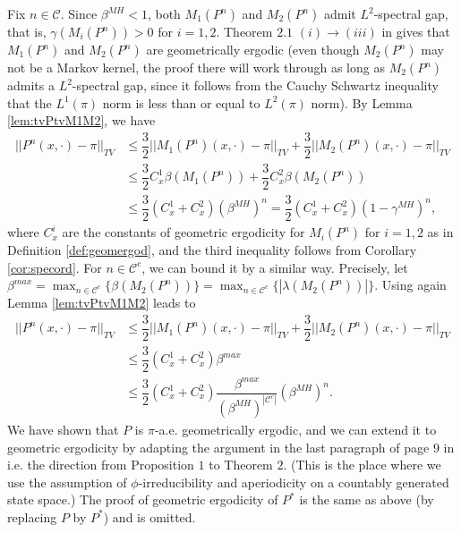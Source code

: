 \documentclass[12pt,a4]{amsart}
\numberwithin{equation}{section}
\theoremstyle{plain}
\theoremstyle{definition}
\theoremstyle{remark}
\let\oldendproof\endproof
\renewenvironment{proof}[1][\proofname]{%
  \oldproof[\noindent\textbf{#1.} ]%
}{\oldendproof}
\newcommand{\1}{\mathds{1}}
\renewcommand{\leq}{\leqslant}
\begin{document}
\begin{proof}[Proof of Theorem \ref{thm:mainresultgeomergod}]
	Fix $n \in \mathcal{C}$. Since $\beta^{MH} < 1$, both $M_1(P^n)$ and $M_2(P^n)$ admit $L^2$-spectral gap, that is, $\gamma(M_i(P^n)) > 0$ for $i= 1,2$. Theorem $2.1$ $(i) \rightarrow (iii)$ in \cite{RR97} gives that $M_1(P^n)$ and $M_2(P^n)$ are geometrically ergodic (even though $M_2(P^n)$ may not be a Markov kernel, the proof there will work through as long as $M_2(P^n)$ admits a $L^2$-spectral gap, since it follows from the Cauchy Schwartz inequality that the $L^1(\pi)$ norm is less than or equal to $L^2(\pi)$ norm). By Lemma \ref{lem:tvPtvM1M2}, we have
	\begin{align*}
		||P^n(x,\cdot) - \pi ||_{TV} &\leq \dfrac{3}{2} ||M_1(P^n)(x,\cdot) - \pi ||_{TV} + \dfrac{3}{2} ||M_2(P^n)(x,\cdot) - \pi ||_{TV} \\
		&\leq \dfrac{3}{2} C^1_x \beta(M_1(P^n)) + \dfrac{3}{2} C^2_x \beta(M_2(P^n)) \\
		&\leq \dfrac{3}{2} (C^1_x + C^2_x) (\beta^{MH})^n =  \dfrac{3}{2} (C^1_x + C^2_x) (1 - \gamma^{MH})^n,
	\end{align*}
	where $C^i_x$ are the constants of geometric ergodicity for $M_i(P^n)$ for $i=1,2$ as in Definition \ref{def:geomergod}, and the third inequality follows from Corollary \ref{cor:specord}. For $n \in \mathcal{C}^c$, we can bound it by a similar way. Precisely, let $\beta^{max} = \max_{n \in \mathcal{C}^c}\{ \beta(M_2(P^n)) \} = \max_{n \in \mathcal{C}^c}\{ |\lambda(M_2(P^n))| \}.$ Using again Lemma \ref{lem:tvPtvM1M2} leads to
	\begin{align*}
		||P^n(x,\cdot) - \pi ||_{TV} &\leq \dfrac{3}{2} ||M_1(P^n)(x,\cdot) - \pi ||_{TV} + \dfrac{3}{2} ||M_2(P^n)(x,\cdot) - \pi ||_{TV} \\
		&\leq \dfrac{3}{2} (C^1_x + C^2_x) \beta^{max} \\
		&\leq \dfrac{3}{2} (C^1_x + C^2_x) \dfrac{\beta^{max}}{(\beta^{MH})^{|\mathcal{C}^c|}}(\beta^{MH})^n .
	\end{align*}
	We have shown that $P$ is $\pi$-a.e. geometrically ergodic, and we can extend it to geometric ergodicity by adapting the argument in the last paragraph of page $9$ in \cite{RR97}  i.e. the direction from Proposition $1$ to Theorem $2$. (This is the place where we use the assumption of $\phi$-irreducibility and aperiodicity on a countably generated state space.) The proof of geometric ergodicity of $P^*$ is the same as above (by replacing $P$ by $P^*$) and is omitted.

\end{proof}
\end{document}
